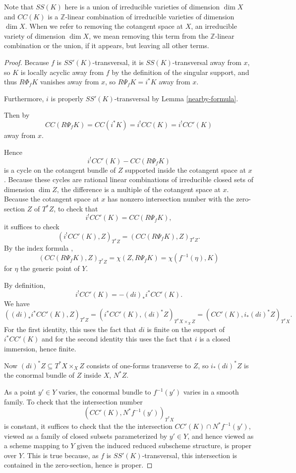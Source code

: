 \documentclass[12pt]{amsart}
\theoremstyle{definition}
\theoremstyle{remark}
\begin{document}
Note that $SS(K)$ here is a union of irreducible varieties of dimension $\dim X$ and $CC(K)$ is a $\mathbb Z$-linear combination of irreducible varieties of dimension $\dim X$. When we refer to removing the cotangent space at $X$, an irreducible variety of dimension $\dim X$, we mean removing this term from the $\mathbb Z$-linear combination or the union, if it appears, but leaving all other terms.


\begin{proof} Because $f$ is $SS'(K)$-transversal, it is $SS(K)$-transversal away from $x$, so $K$ is locally acyclic away from $f$ by the definition of the singular support, and thus $R \Phi_f K$ vanishes away from $x$, so $R \Psi_f K = i^* K$ away from $x$.

Furthermore, $i$ is properly $SS'(K)$-transversal by Lemma \ref{nearby-formula}.

Then by \cite[Theorem 7.6]{saito1} \[  CC ( R \Psi_{f} K) = CC( i^* K ) = i^! CC(K) = i^! CC'(K) \] away from $x$. 

Hence \[i^! CC'(K) -  CC ( R \Psi_{f} K) \] is a cycle on the cotangent bundle of $Z$ supported inside the cotangent space at $x$. Because these cycles are rational linear combinations of irreducible closed sets of dimension $\dim Z$, the difference is a multiple of the cotangent space at $x$. Because the cotangent space at $x$ has nonzero intersection number with the zero-section $Z$ of $T^* Z$, to check that \[ i^! CC'(K) = CC(R\Psi_f K),\] it suffices to check \[ (i^! CC'(K) , Z)_{T^*Z}=   (CC ( R \Psi_{f} K) , Z)_{T^*Z} . \] By the index formula \cite[Theorem 7 .13]{saito1},  \[ (CC ( R \Psi_{f} K) , Z)_{T^*Z} =  \chi(Z, R \Psi_f K) =\chi ( f^{-1}(\eta),K)\] for $\eta$ the generic point of $Y$. 

By definition, \[i^! CC'(K) = - (di)_* i^*  CC'(K).\] We have \cite[Proposition 8.1.1(c)]{Fulton}
\[  ((di)_* i^* CC'(K), Z)_{T^*Z} = (i^* CC'(K),  (di)^* Z)_{T^*X \times_X Z} = (CC'(K), i_* (di)^* Z) _{T^*X} .\]
For the first identity, this uses the fact that $di$ is finite on the support of $i^* CC'(K)$ and for the second identity this uses the fact that $i$ is a closed immersion, hence finite.

Now $(di)^ * Z \subseteq  T^* X \times_X Z$ consists of one-forms transverse to $Z$, so $i_* (di)^* Z$ is the conormal bundle of $Z$ inside $X$, $N^*Z$. 

As a point $y' \in Y$ varies, the conormal bundle to $f^{-1}(y')$ varies in a smooth family. To check that the intersection number  \[ (CC'(K), N^*f^{-1} (y') )_{T^*X} \] is constant, it suffices to check that the the intersection $ CC'(K) \cap N^*f^{-1} (y') $, viewed as a family of closed subsets parameterized by $y' \in Y$, and hence viewed as a scheme mapping to $Y$ given the induced reduced subscheme structure, is proper over $Y$. This is true because, as $f$ is $SS'(K)$-transversal, this intersection is contained in the zero-section, hence is proper.


\end{proof}
\end{document}

